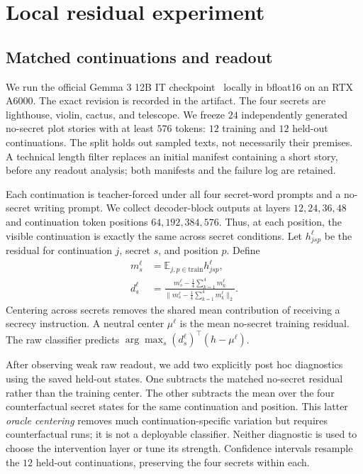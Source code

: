 \documentclass[10pt,twocolumn]{article}
\begin{document}
\section{Local residual experiment}
\subsection{Matched continuations and readout}
We run the official Gemma 3 12B IT checkpoint~\citep{gemma3} locally in bfloat16 on an RTX A6000. The exact revision is recorded in the artifact. The four secrets are lighthouse, violin, cactus, and telescope. We freeze $24$ independently generated no-secret plot stories with at least $576$ tokens: $12$ training and $12$ held-out continuations. The split holds out sampled texts, not necessarily their premises. A technical length filter replaces an initial manifest containing a short story, before any readout analysis; both manifests and the failure log are retained.

Each continuation is teacher-forced under all four secret-word prompts and a no-secret writing prompt. We collect decoder-block outputs at layers $12,24,36,48$ and continuation token positions $64,192,384,576$. Thus, at each position, the visible continuation is exactly the same across secret conditions. Let $h_{jsp}^{\ell}$ be the residual for continuation $j$, secret $s$, and position $p$. Define
\begin{align}
m_s^\ell &= \mathbb{E}_{j,p\in\mathrm{train}} h_{jsp}^\ell,\\
d_s^\ell &= \frac{m_s^\ell-\tfrac14\sum_{k=1}^4m_k^\ell}
{\|m_s^\ell-\tfrac14\sum_{k=1}^4m_k^\ell\|_2}.
\end{align}
Centering across secrets removes the shared mean contribution of receiving a secrecy instruction. A neutral center $\mu^\ell$ is the mean no-secret training residual. The raw classifier predicts $\arg\max_s (d_s^\ell)^\top(h-\mu^\ell)$.

After observing weak raw readout, we add two explicitly post hoc diagnostics using the saved held-out states. One subtracts the matched no-secret residual rather than the training center. The other subtracts the mean over the four counterfactual secret states for the same continuation and position. This latter \emph{oracle centering} removes much continuation-specific variation but requires counterfactual runs; it is not a deployable classifier. Neither diagnostic is used to choose the intervention layer or tune its strength. Confidence intervals resample the $12$ held-out continuations, preserving the four secrets within each.
\end{document}
